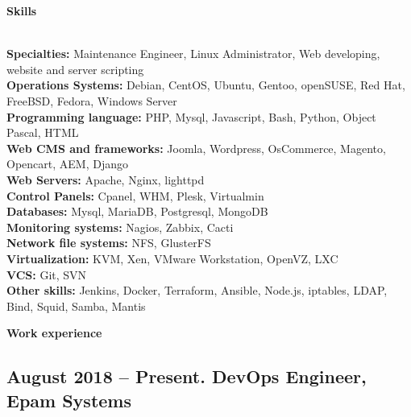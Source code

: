 \documentclass[letterpaper]{article}
\renewcommand{\section}[1]{
  {
    \large \colorbox{my-gray}{
      \begin{minipage}
        {\textwidth-0.175in}
        {\textbf{#1 \vphantom{p\^{E}}}}
      \end{minipage}
    }
  }
}
\begin{document}
\section{Skills}
\label{sec-1}\\
\label{sec-1-1}
\textbf{Specialties:} Maintenance Engineer, Linux Administrator, Web developing, website and server scripting\\
\label{sec-1-2}
\textbf{Operations Systems:} Debian, CentOS, Ubuntu, Gentoo, openSUSE, Red Hat, FreeBSD, Fedora, Windows Server\\
\label{sec-1-3}
\textbf{Programming language:} PHP, Mysql, Javascript, Bash, Python, Object Pascal, HTML\\
\label{sec-1-4}
\textbf{Web CMS and frameworks:} Joomla, Wordpress, OsCommerce, Magento, Opencart, AEM, Django\\
\label{sec-1-5}
\textbf{Web Servers:} Apache, Nginx, lighttpd\\
\label{sec-1-6}
\textbf{Control Panels:} Cpanel, WHM, Plesk, Virtualmin\\
\label{sec-1-7}
\textbf{Databases:} Mysql, MariaDB, Postgresql, MongoDB\\
\label{sec-1-8}
\textbf{Monitoring systems:} Nagios, Zabbix, Cacti\\
\label{sec-1-9}
\textbf{Network file systems:} NFS, GlusterFS\\
\label{sec-1-10}
\textbf{Virtualization:} KVM, Xen, VMware Workstation, OpenVZ, LXC\\
\label{sec-1-11}
\textbf{VCS:} Git, SVN\\
\label{sec-1-12}
\textbf{Other skills:}  Jenkins, Docker, Terraform, Ansible, Node.js, iptables, LDAP, Bind, Squid, Samba, Mantis\\
\section{Work experience}
\label{sec-2}
\subsection{{August 2018 – Present}. DevOps Engineer, Epam Systems}
\label{sec-2-1}
\end{document}
